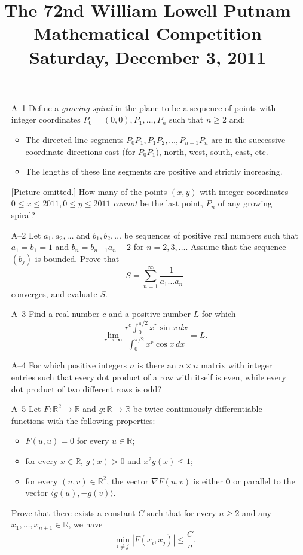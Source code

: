 \documentclass[amssymb,twocolumn,pra,10pt,aps]{revtex4-1}
\begin{document}
\title{The 72nd William Lowell Putnam Mathematical Competition \\
    Saturday, December 3, 2011}
\maketitle

\newcommand{\RR}{\mathbb{R}}

\begin{itemize}

\item[A--1] Define a \textit{growing spiral} in the plane to be a sequence
of points with integer coordinates $P_0 = (0,0), P_1, \dots, P_n$ such
that $n \geq 2$ and:
\begin{itemize}
\item The directed line segments $P_0 P_1, P_1 P_2, \dots, P_{n-1} P_n$
are in the successive coordinate directions east (for $P_0 P_1$), north,
west, south, east, etc.
\item The lengths of these line segments are positive and strictly
increasing.
\end{itemize} [Picture omitted.]  How many of the points $(x,y)$ with
integer coordinates $0\leq x\leq 2011, 0\leq y\leq 2011$ \emph{cannot}
be the last point, $P_n$ of any growing spiral?

\item[A--2] Let $a_1,a_2,\dots$ and $b_1,b_2,\dots$ be sequences of positive
real numbers such that $a_1 = b_1 = 1$ and $b_n = b_{n-1} a_n - 2$ for
$n=2,3,\dots$. Assume that the sequence $(b_j)$ is bounded. Prove that
\[
S = \sum_{n=1}^\infty \frac{1}{a_1...a_n}
\]
converges, and evaluate $S$.

\item[A--3] Find a real number $c$ and a positive number $L$ for which
\[
\lim_{r\to\infty} \frac{r^c \int_0^{\pi/2} x^r \sin x \,dx}{\int_0^{\pi/2} x^r \cos x \,dx} = L.
\]

\item[A--4] For which positive integers $n$ is there an $n \times n$ matrix
with integer entries such that every dot product of a row with itself is
even, while every dot product of two different rows is odd?

\item[A--5] Let $F : \RR^2 \to \RR$ and $g : \RR \to \RR$ be twice
continuously differentiable functions with the following properties:
\begin{itemize}
\item $F(u,u) = 0$ for every $u \in \RR$;
\item for every $x \in \RR$, $g(x) > 0$ and $x^2 g(x) \leq 1$;
\item for every $(u,v) \in \RR^2$, the vector $\nabla F(u,v)$ is either $\mathbf{0}$ or parallel to the vector $\langle g(u), -g(v) \rangle$.
\end{itemize}
Prove that there exists a constant $C$ such that for every $n\geq 2$ and any $x_1,\dots,x_{n+1} \in \RR$, we have
\[
\min_{i \neq j} |F(x_i,x_j)| \leq \frac{C}{n}.
\]


\end{itemize}
\end{document}
